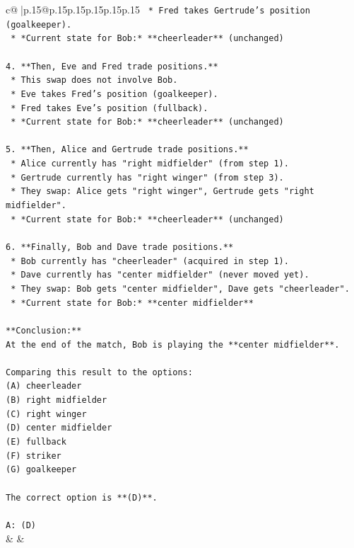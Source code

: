 \documentclass{article}
\begin{document}
{\begin{supertabular}{c@{$\;$}|p{.15\linewidth}@{}p{.15\linewidth}p{.15\linewidth}p{.15\linewidth}p{.15\linewidth}p{.15\linewidth}}
{{{\texttt{    *   Fred takes Gertrude's position (goalkeeper).} \\
\texttt{    *   *Current state for Bob:* **cheerleader** (unchanged)} \\
\\ 
\texttt{4.  **Then, Eve and Fred trade positions.**} \\
\texttt{    *   This swap does not involve Bob.} \\
\texttt{    *   Eve takes Fred's position (goalkeeper).} \\
\texttt{    *   Fred takes Eve's position (fullback).} \\
\texttt{    *   *Current state for Bob:* **cheerleader** (unchanged)} \\
\\ 
\texttt{5.  **Then, Alice and Gertrude trade positions.**} \\
\texttt{    *   Alice currently has "right midfielder" (from step 1).} \\
\texttt{    *   Gertrude currently has "right winger" (from step 3).} \\
\texttt{    *   They swap: Alice gets "right winger", Gertrude gets "right midfielder".} \\
\texttt{    *   *Current state for Bob:* **cheerleader** (unchanged)} \\
\\ 
\texttt{6.  **Finally, Bob and Dave trade positions.**} \\
\texttt{    *   Bob currently has "cheerleader" (acquired in step 1).} \\
\texttt{    *   Dave currently has "center midfielder" (never moved yet).} \\
\texttt{    *   They swap: Bob gets "center midfielder", Dave gets "cheerleader".} \\
\texttt{    *   *Current state for Bob:* **center midfielder**} \\
\\ 
\texttt{**Conclusion:**} \\
\texttt{At the end of the match, Bob is playing the **center midfielder**.} \\
\\ 
\texttt{Comparing this result to the options:} \\
\texttt{(A) cheerleader} \\
\texttt{(B) right midfielder} \\
\texttt{(C) right winger} \\
\texttt{(D) center midfielder} \\
\texttt{(E) fullback} \\
\texttt{(F) striker} \\
\texttt{(G) goalkeeper} \\
\\ 
\texttt{The correct option is **(D)**.} \\
\\ 
\texttt{A: (D)} \\
            }
        }
    }
    & & \\ \\


\end{supertabular}}
\end{document}

